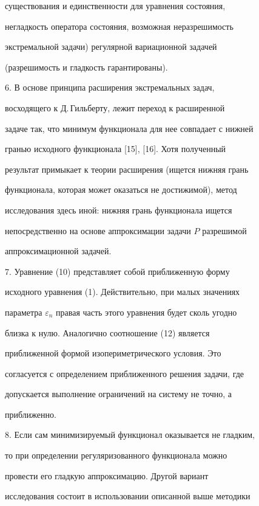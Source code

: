 существования и единственности для уравнения состояния, 


негладкость оператора состояния, возможная неразрешимость 


экстремальной задачи) регулярной вариационной задачей 


(разрешимость и гладкость гарантированы). 


 


6. В основе принципа расширения экстремальных задач, 


восходящего к Д.\,Гильберту, лежит переход к расширенной 


задаче так, что минимум функционала для нее совпадает с нижней 


гранью исходного функционала [15], [16]. Хотя полученный 


результат примыкает к теории расширения (ищется нижняя грань 


функционала, которая может оказаться не достижимой), метод 


исследования здесь иной: нижняя грань функционала ищется 


непосредственно на основе аппроксимации задачи $P$ разрешимой 


аппроксимационной задачей. 


 


7. Уравнение (10) представляет собой приближенную форму 


исходного уравнения (1). Действительно, при малых значениях 


параметра $\varepsilon_n$ правая часть этого уравнения будет сколь угодно 


близка к нулю. Аналогично соотношение (12) является 


приближенной формой изопериметрического условия. Это 


согласуется с определением приближенного решения задачи, где 


допускается выполнение ограничений на систему не точно, а 


приближенно. 


 


8. Если сам минимизируемый функционал оказывается не гладким, 


то при определении регуляризованного функционала можно 


провести его гладкую аппроксимацию. Другой вариант 


исследования состоит в использовании описанной выше методики 


